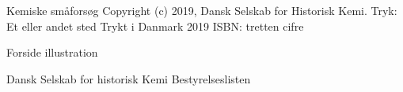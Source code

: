Kemiske småforsøg
Copyright (c) 2019, Dansk Selskab for Historisk Kemi.
Tryk: Et eller andet sted
Trykt i Danmark 2019
ISBN: tretten cifre

Forside illustration



Dansk Selskab for historisk Kemi
Bestyrelseslisten
